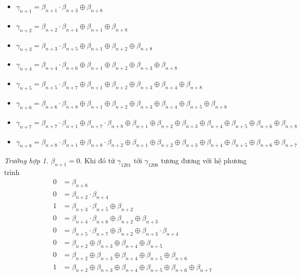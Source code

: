 \begin{itemize}
    \item $\gamma_{n+1} = \beta_{n+1} \cdot \beta_{n+3} \oplus \beta_{n+8}$
    \item $\gamma_{n+2} = \beta_{n+2} \cdot \beta_{n+4} \oplus \beta_{n+1} \oplus \beta_{n+8}$
    \item $\gamma_{n+3} = \beta_{n+3} \cdot \beta_{n+5} \oplus \beta_{n+1} \oplus \beta_{n+2} \oplus \beta_{n+8}$
    \item $\gamma_{n+4} = \beta_{n+4} \cdot \beta_{n+6} \oplus \beta_{n+1} \oplus \beta_{n+2} \oplus \beta_{n+3} \oplus \beta_{n+8}$
    \item $\gamma_{n+5} = \beta_{n+5} \cdot \beta_{n+7} \oplus \beta_{n+1} \oplus \beta_{n+2} \oplus \beta_{n+3} \oplus \beta_{n+4} \oplus \beta_{n+8}$
    \item $\gamma_{n+6} = \beta_{n+6} \cdot \beta_{n+8} \oplus \beta_{n+1} \oplus \beta_{n+2} \oplus \beta_{n+3} \oplus \beta_{n+4} \oplus \beta_{n+5} \oplus \beta_{n+8}$
    \item $\gamma_{n+7} = \beta_{n+7} \cdot \beta_{n+1} \oplus \beta_{n+7} \cdot \beta_{n+8} \oplus \beta_{n+1} \oplus \beta_{n+2} \oplus \beta_{n+3} \oplus \beta_{n+4} \oplus \beta_{n+5} \oplus \beta_{n+6} \oplus \beta_{n+8}$
    \item $\gamma_{n+8} = \beta_{n+8} \cdot \beta_{n+1} \oplus \beta_{n+8} \cdot \beta_{n+2} \oplus \beta_{n+1} \oplus \beta_{n+2} \oplus \beta_{n+3} \oplus \beta_{n+4} \oplus \beta_{n+5} \oplus \beta_{n+6} \oplus \beta_{n+7}$
\end{itemize}

\textit{Trường hợp 1.} $\beta_{n+1} = 0$. Khi đó từ $\gamma_{1201}$ tới $\gamma_{1208}$ tương đương với hệ phương trình
\begin{align*}
0 & = \beta_{n+8} \\
0 & = \beta_{n+2} \cdot \beta_{n+4} \\
1 & = \beta_{n+3} \cdot \beta_{n+5} \oplus \beta_{n+2} \\
0 & = \beta_{n+4} \cdot \beta_{n+6} \oplus \beta_{n+2} \oplus \beta_{n+3} \\
0 & = \beta_{n+5} \cdot \beta_{n+7} \oplus \beta_{n+2} \oplus \beta_{n+3} \cdot \beta_{n+4} \\
0 & = \beta_{n+2} \oplus \beta_{n+3} \oplus \beta_{n+4} \oplus \beta_{n+5} \\
0 & = \beta_{n+2} \oplus \beta_{n+3} \oplus \beta_{n+4} \oplus \beta_{n+5} \oplus \beta_{n+6} \\
1 & = \beta_{n+2} \oplus \beta_{n+3} \oplus \beta_{n+4} \oplus \beta_{n+5} \oplus \beta_{n+6} \oplus \beta_{n+7} \\
\end{align*}

